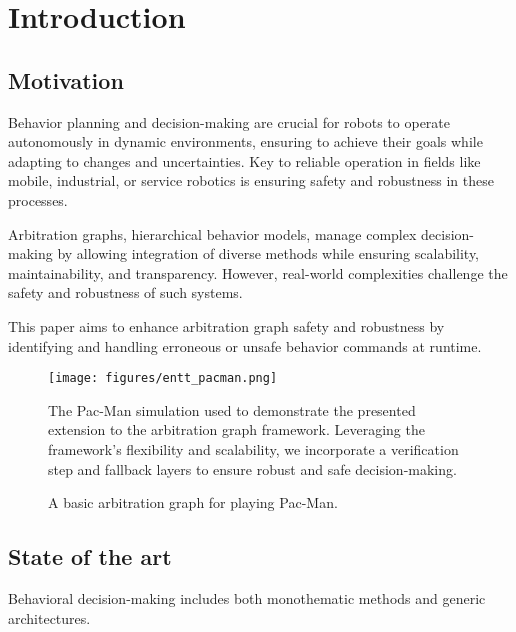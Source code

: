 \section{Introduction}

\subsection{Motivation}

Behavior planning and decision-making are crucial for robots to operate autonomously in dynamic environments, ensuring to achieve their goals while adapting to changes and uncertainties.
Key to reliable operation in fields like mobile, industrial, or service robotics is ensuring safety and robustness in these processes.

Arbitration graphs, hierarchical behavior models, manage complex decision-making
by allowing integration of diverse methods while ensuring scalability, maintainability, and transparency.
However, real-world complexities challenge the safety and robustness of such systems.

This paper aims to enhance arbitration graph safety and robustness by identifying and handling erroneous or unsafe behavior commands at runtime.

\begin{figure}
    \centering
    \texttt{[image: figures/entt\_pacman.png]}
    \caption{The Pac-Man simulation used to demonstrate the presented extension to the arbitration graph framework.
    Leveraging the framework's flexibility and scalability,
    we incorporate a verification step and fallback layers
    to ensure robust and safe decision-making.}
    \label{fig:entt-pacman}
\end{figure}

\begin{figure}
    \centering
    
    \caption{A basic arbitration graph for playing Pac-Man.}
    \label{fig:pacman-arbitrator-base}
\end{figure}

\subsection{State of the art}
Behavioral decision-making includes both monothematic methods and generic architectures.

